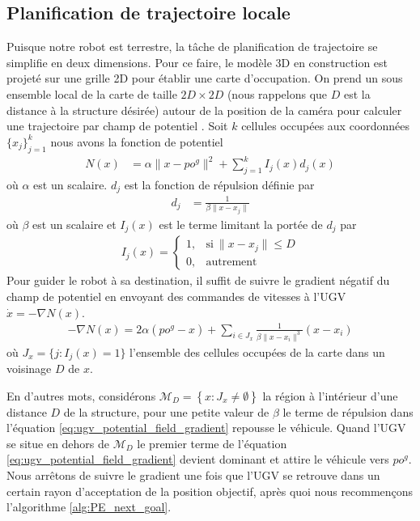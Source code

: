 \subsection{Planification de trajectoire locale}

Puisque notre robot est terrestre, la tâche de planification de trajectoire se simplifie en deux dimensions. Pour ce faire, le modèle 3D en construction est projeté sur une grille 2D pour établir une carte d'occupation. On prend un sous ensemble local de la carte de taille $2D \times 2D$ (nous rappelons que $D$ est la distance à la structure désirée) autour de la position de la caméra pour calculer une trajectoire par champ de potentiel \citep{Khatib1990, Choset2005}. Soit $k$ cellules occupées aux coordonnées $\{x_j\}^k_{j=1}$ nous avons la fonction de potentiel
\begin{align}
  N(x) &= \alpha \| x - {po}^g \|^2 + \sum^k_{j=1} I_j(x)d_j(x)
\end{align}
où $\alpha$ est un scalaire. $d_j$ est la fonction de répulsion définie par
\begin{align}
  d_j &= \frac{1}{\beta \| x - x_j \|}
\end{align}
où $\beta$ est un scalaire et $I_j(x)$ est le terme limitant la portée de $d_j$ par
\begin{align}
  I_j(x) =     \begin{cases}
      1, & \text{si}\ \|x - x_j\| \leq D \\
      0, & \text{autrement}
    \end{cases}
\end{align}
Pour guider le robot à sa destination, il suffit de suivre le gradient négatif du champ de potentiel en envoyant des commandes de vitesses à l'UGV $\dot x = -\nabla N(x)$.
\begin{align}
  - \nabla N(x) = 2 \alpha ({po}^g - x) + \sum_{i \in J_x}\frac{1}{\beta \| x - x_i\|^3}(x - x_i)
  \label{eq:ugv_potential_field_gradient}
\end{align}
où $J_x = \{ j : I_j(x) = 1\}$ l'ensemble des cellules occupées de la carte dans un voisinage $D$ de $x$.

En d'autres mots, considérons $\mathcal M_D = \left\lbrace x : J_{x} \neq \emptyset \right\rbrace $ la région à l'intérieur d'une distance $D$ de la structure, pour une petite valeur de $\beta$ le terme de répulsion dans l'équation \ref{eq:ugv_potential_field_gradient} repousse le véhicule. Quand l'UGV se situe en dehors de $\mathcal M_D$ le premier terme de l'équation \ref{eq:ugv_potential_field_gradient} devient dominant et attire le véhicule vers $po^g$. Nous arrêtons de suivre le gradient une fois que l'UGV se retrouve dans un certain rayon d'acceptation de la position objectif, après quoi nous recommençons l'algorithme \ref{alg:PE_next_goal}.

